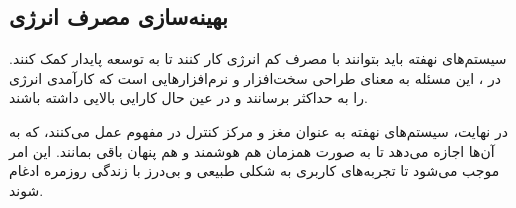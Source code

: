\subsection*{بهینه‌سازی مصرف انرژی}
سیستم‌های نهفته باید بتوانند با مصرف کم انرژی کار کنند تا به توسعه پایدار کمک کنند. در ، این مسئله به معنای طراحی سخت‌افزار و نرم‌افزارهایی است که کارآمدی انرژی را به حداکثر برسانند و در عین حال کارایی بالایی داشته باشند.

در نهایت، سیستم‌های نهفته به عنوان مغز و مرکز کنترل در مفهوم \textbf{} عمل می‌کنند، که به آن‌ها اجازه می‌دهد تا به صورت همزمان هم هوشمند و هم پنهان باقی بمانند. این امر موجب می‌شود تا تجربه‌های کاربری به شکلی طبیعی و بی‌درز با زندگی روزمره ادغام شوند.
